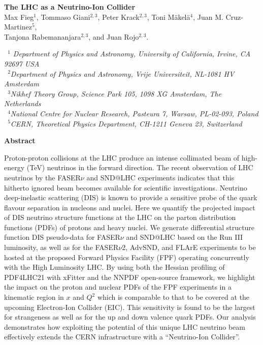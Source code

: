 \documentclass[11pt,a4paper]{article}
\numberwithin{equation}{section}
\numberwithin{figure}{section}
\numberwithin{table}{section}
\begin{document}

\vspace{0.7cm}

\begin{center}
  {\Large \bf The LHC as a Neutrino-Ion Collider }\\
  \vspace{1.1cm}
  {\small
Max Fieg$^{1}$, Tommaso Giani$^{2,3}$, Peter Krack$^{2,3}$, Toni M\"akel\"a$^{4}$, Juan M. Cruz-Martinez$^{5}$, \\[0.1cm]
    Tanjona Rabemananjara$^{2,3}$, and Juan Rojo$^{2,3}$.
  }\\
  
\vspace{0.7cm}

{\it \small
    ~$^1$ Department of Physics and Astronomy, University of California, Irvine, CA 92697 USA  \\[0.1cm]
    ~$^2$Department of Physics and Astronomy, Vrije Universiteit, NL-1081 HV Amsterdam\\[0.1cm]
    ~$^3$Nikhef Theory Group, Science Park 105, 1098 XG Amsterdam, The Netherlands\\[0.1cm]
    ~$^4$National Centre for Nuclear Research, Pasteura 7, Warsaw, PL-02-093, Poland \\[0.1cm]
    ~$^5$CERN, Theoretical Physics Department, CH-1211 Geneva 23, Switzerland \\[0.1cm]
 }


\vspace{1.0cm}

{\bf \large Abstract}

\end{center}

Proton-proton collisions at the LHC produce an intense collimated beam of high-energy (TeV) neutrinos
in the forward direction.
%
The recent  observation of LHC neutrinos by the FASER$\nu$ and SND@LHC experiments
indicates that this hitherto ignored beam becomes available for scientific investigations.
%
Neutrino deep-inelastic scattering (DIS) is known
to provide a sensitive probe of the quark flavour separation in nucleons
and nuclei.
%
Here we quantify the projected impact of DIS neutrino structure functions at the LHC
on the parton distribution functions (PDFs) of protons and heavy nuclei.
%
We generate differential structure function DIS pseudo-data 
for  FASER$\nu$ and SND@LHC based on the Run III luminosity,
as well as for the FASER$\nu$2, AdvSND, and FLArE experiments
to be  hosted at the proposed
 Forward Physics Facility (FPF) operating concurrently with the High Luminosity LHC.
 By using both the Hessian profiling of PDF4LHC21 with {\sc\small xFitter} and
 the  NNPDF open-source framework,
 we highlight the impact on the proton and nuclear PDFs of the FPF
 experiments in a kinematic region in $x$ and $Q^2$ which is comparable to that
 to be covered at the upcoming
 Electron-Ion Collider (EIC).
 This sensitivity is found to be the largest for  strangeness as well as for
 the up and down valence quark PDFs.
%
 Our analysis demonstrates how exploiting the potential
 of this unique LHC neutrino beam  effectively
extends the CERN infrastructure with a ``Neutrino-Ion Collider''.
\end{document}
